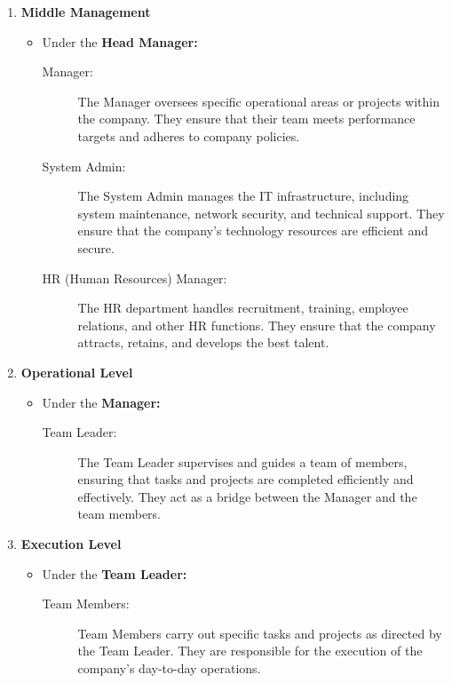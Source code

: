 \begin{enumerate}
            \item \textbf{Middle Management}
            \begin{itemize}
                \item Under the \textbf{Head Manager:}
            \begin{description}
                \item[Manager: ] The Manager oversees specific operational areas or projects within the company. They ensure that their team meets performance targets and adheres to company policies.
                \item[System Admin: ] The System Admin manages the IT infrastructure, including system maintenance, network security, and technical support. They ensure that the company’s technology resources are efficient and secure.
                \item[HR (Human Resources) Manager:] The HR department handles recruitment, training, employee relations, and other HR functions. They ensure that the company attracts, retains, and develops the best talent.
            \end{description}
            \end{itemize}
            \item \textbf{Operational Level}
            \begin{itemize}
                \item Under the \textbf{Manager:}
            \begin{description}
                \item[Team Leader: ] The Team Leader supervises and guides a team of members, ensuring that tasks and projects are completed efficiently and effectively. They act as a bridge between the Manager and the team members.
            \end{description}
            \end{itemize}
            \item \textbf{Execution Level}
            \begin{itemize}
                \item Under the \textbf{Team Leader:}
            \begin{description}
                \item[Team Members:] Team Members carry out specific tasks and projects as directed by the Team Leader. They are responsible for the execution of the company’s day-to-day operations.
            \end{description}
            \end{itemize}
        \end{enumerate}
